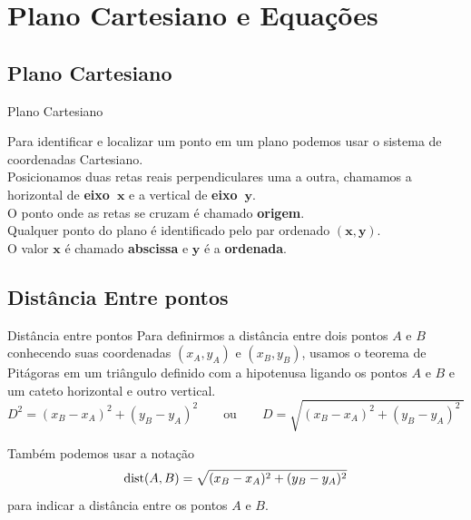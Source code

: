 \chapter{Plano Cartesiano e Equações}
\label{cap:equacoes}

\section{Plano Cartesiano}

\begin{teoria}{Plano Cartesiano}

    \begin{minipage}[c]{.6\columnwidth}
        Para identificar e localizar um ponto em um plano podemos usar o sistema de coordenadas Cartesiano.
        \\
        
        Posicionamos duas retas reais perpendiculares uma a outra, chamamos a horizontal de 
        \textbf{eixo~$\mathbf{x}$} e a vertical de \textbf{eixo~$\mathbf{y}$}.
        \\
        
        O ponto onde as retas se cruzam é chamado \textbf{origem}.
        \\
        
        Qualquer ponto do plano é identificado pelo par ordenado $\mathbf{(x,y)}$. 
        \\
        
        O valor $\mathbf{x}$ é chamado \textbf{abscissa} e $\mathbf{y}$ é a \textbf{ordenada}.
    \end{minipage}%
    \begin{minipage}[c]{.39\columnwidth}
    \end{minipage}
            
\end{teoria}

\section{Distância Entre pontos}

\begin{teoria}{Distância entre pontos}
    Para definirmos a distância entre dois pontos $A$ e $B$ conhecendo suas coordenadas $(x_A,y_A)$ e $(x_B,y_B)$,
    usamos o teorema de Pitágoras em um triângulo definido com a hipotenusa ligando os pontos $A$ e $B$ 
    e um cateto horizontal e outro vertical.
    \[ D^2 = (x_B-x_A)^2 + (y_B-y_A)^2  \qquad \text{ou} \qquad D = \sqrt{ (x_B-x_A)^2 + (y_B-y_A)^2 \;} \]
    
    
    Também podemos usar a notação 
    \[ \operatorname{dist}(A,B) = \sqrt{(x_B-x_A)^2 + (y_B-y_A)^2} \]
    para indicar a distância entre os pontos $A$ e $B$.
\end{teoria}

